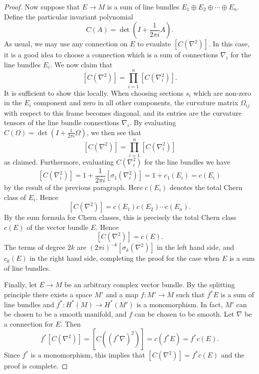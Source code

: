 \documentclass[a4paper,openany]{scrbook}
\begin{document}
\begin{thm}
\begin{proof}
Now suppose that $E \to M$ is a sum of line bundles $E_1 \oplus E_2 \oplus \cdots \oplus E_n$. Define the particular invariant polynomial
\[C(A) = \det\left(I + \frac{1}{2\pi i} A\right).\]
As usual, we may use any connection on $E$ to evaulate $[C(\nabla^2)]$. In this case, it is a good idea to choose a connection which is a sum of connections $\nabla_i$ for the line bundles $E_i$. We now claim that
\[[C(\nabla^2)] = \prod_{i = 1}^n [C(\nabla_i^2)].\]
It is sufficient to show this locally. When choosing sections $s_i$ which are non-zero in the $E_i$ component and zero in all other components, the curvature matrix $\Omega_{ij}$ with respect to this frame becomes diagonal, and its entries are the curvature tensors of the line bundle connections $\nabla_i$. By evaluating $C(\Omega) = \det\left(I + \frac{1}{2\pi i} \Omega\right)$, we then see that
\[[C(\nabla^2)] = \prod_{i = 1}^n [C(\nabla_i^2)]\]
as claimed. Furthermore, evaluating $C(\nabla_i^2)$ for the line bundles we have
\[[C(\nabla_i^2)] = 1 + \frac{1}{2\pi i} [\sigma_1(\nabla_i^2)] = 1 + c_1(E_i) = c(E_i)\]
by the result of the previous paragraph. Here $c(E_i)$ denotes the total Chern class of $E_i$. Hence
\[[C(\nabla^2)] = c(E_1)c(E_2) \cdots c(E_n).\]
By the sum formula for Chern classes, this is precisely the total Chern class $c(E)$ of the vector bundle $E$. Hence
\[[C(\nabla^2)] = c(E).\]
The terms of degree $2k$ are $(2\pi i)^{-k} [\sigma_k(\nabla^2)]$ in the left hand side, and $c_k(E)$ in the right hand side, completing the proof for the case when $E$ is a sum of line bundles.

Finally, let $E \to M$ be an arbitrary complex vector bundle. 
By the splitting principle there exists a space $M'$ and a map $f \colon M' \to M$ such that $f^*E$ is a sum of line bundles and $f^* \colon H^*(M) \to H^*(M')$ is a monomorphism. In fact, $M'$ can be chosen to be a smooth manifold, and $f$ can be chosen to be smooth.  Let $\nabla$ be a connection for $E$. Then
\[f^*[C(\nabla^2)] = [C((f^*\nabla)^2)] = c(f^*E) = f^*c(E).\]
Since $f^*$ is a monomorphism, this implies that $[C(\nabla^2)] = f^*c(E)$ and the proof is complete.
\end{proof}
\end{thm}


\end{document}
